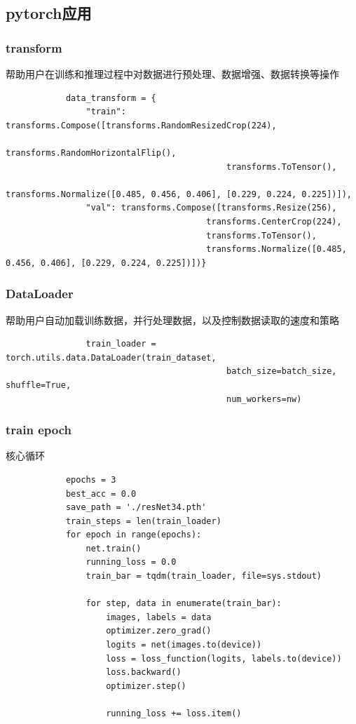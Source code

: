 \documentclass[a4paper,12pt]{article}
\begin{document}
\subsection{\color{red}pytorch应用}
    \subsubsection{\color{green}transform} 
    帮助用户在训练和推理过程中对数据进行预处理、数据增强、数据转换等操作
        \begin{verbatim}
            data_transform = {
                "train": transforms.Compose([transforms.RandomResizedCrop(224),
                                            transforms.RandomHorizontalFlip(),
                                            transforms.ToTensor(),
                                            transforms.Normalize([0.485, 0.456, 0.406], [0.229, 0.224, 0.225])]),
                "val": transforms.Compose([transforms.Resize(256),
                                        transforms.CenterCrop(224),
                                        transforms.ToTensor(),
                                        transforms.Normalize([0.485, 0.456, 0.406], [0.229, 0.224, 0.225])])}
        \end{verbatim}

    \subsubsection{\color{green}DataLoader} 
    帮助用户自动加载训练数据，并行处理数据，以及控制数据读取的速度和策略
        \begin{verbatim}
                train_loader = torch.utils.data.DataLoader(train_dataset,
                                            batch_size=batch_size, shuffle=True,
                                            num_workers=nw)
        \end{verbatim}

    \subsubsection{\color{green}train epoch} 
    核心循环
        \begin{verbatim}
            epochs = 3
            best_acc = 0.0
            save_path = './resNet34.pth'
            train_steps = len(train_loader)
            for epoch in range(epochs):
                net.train()
                running_loss = 0.0
                train_bar = tqdm(train_loader, file=sys.stdout)

                for step, data in enumerate(train_bar):
                    images, labels = data
                    optimizer.zero_grad()
                    logits = net(images.to(device))
                    loss = loss_function(logits, labels.to(device))
                    loss.backward()
                    optimizer.step()

                    running_loss += loss.item()

        \end{verbatim}
\end{document}
